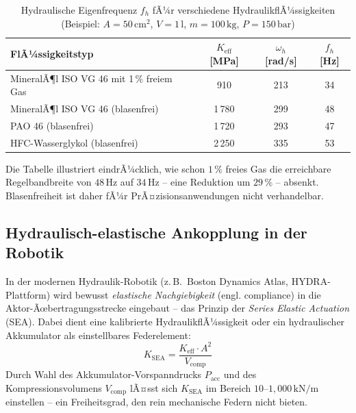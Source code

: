 ﻿\documentclass[a4paper,12pt]{scrreprt}
\theoremstyle{definition}
\begin{document}
\begin{table}[H]
  \centering
  \caption{Hydraulische Eigenfrequenz $f_h$ fÃ¼r verschiedene HydraulikflÃ¼ssigkeiten
    (Beispiel: $A = 50\,\mathrm{cm}^2$, $V = 1\,\mathrm{l}$, $m = 100\,\mathrm{kg}$,
    $P = 150\,\mathrm{bar}$)}
  \label{tab:eigenfrequenz}
  \begin{tabular}{lccc}
    \toprule
    FlÃ¼ssigkeitstyp & $K_{\mathrm{eff}}$ [MPa] & $\omega_h$ [rad/s] & $f_h$ [Hz] \\
    \midrule
    MineralÃ¶l ISO VG 46 mit 1\,\% freiem Gas  &   910 &  213 &  34 \\
    MineralÃ¶l ISO VG 46 (blasenfrei)           & 1\,780 &  299 &  48 \\
    PAO 46 (blasenfrei)                        & 1\,720 &  293 &  47 \\
    HFC-Wasserglykol (blasenfrei)              & 2\,250 &  335 &  53 \\
    \bottomrule
  \end{tabular}
\end{table}

Die Tabelle illustriert eindrÃ¼cklich, wie schon $1\,\%$ freies Gas die
erreichbare Regelbandbreite von $48\,\mathrm{Hz}$ auf $34\,\mathrm{Hz}$
-- eine Reduktion um $29\,\%$ -- absenkt. Blasenfreiheit ist daher
fÃ¼r PrÃ¤zisionsanwendungen nicht verhandelbar.

\subsection{Hydraulisch-elastische Ankopplung in der Robotik}

In der modernen Hydraulik-Robotik (z.\,B.\ Boston Dynamics Atlas, HYDRA-Plattform)
wird bewusst \emph{elastische Nachgiebigkeit} (engl. compliance) in die
Aktor-Ãœbertragungsstrecke eingebaut -- das Prinzip der
\emph{Series Elastic Actuation} (SEA). Dabei dient eine kalibrierte
HydraulikflÃ¼ssigkeit oder ein hydraulischer Akkumulator als einstellbares
Federelement:
\begin{equation}
  K_{\mathrm{SEA}} = \frac{K_{\mathrm{eff}} \cdot A^2}{V_{\mathrm{comp}}}
  \label{eq:k_sea}
\end{equation}
Durch Wahl des Akkumulator-Vorspanndrucks $P_{\mathrm{acc}}$ und des
Kompressionsvolumens $V_{\mathrm{comp}}$ lÃ¤sst sich $K_{\mathrm{SEA}}$
im Bereich $10$--$1{,}000\,\mathrm{kN/m}$ einstellen -- ein Freiheitsgrad,
den rein mechanische Federn nicht bieten.

\end{document}
